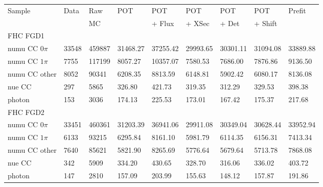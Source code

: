 \begin{table}[ht]
  \begin{adjustbox}{center}
    \tabcolsep=0.11cm
    \begin{tabular}{lllllllll}
      \toprule
      \multirow{2}{*}{Sample} & \multirow{2}{*}{Data} & Raw      & \multirow{2}{*}{\Gls{POT}} & \Gls{POT} & \Gls{POT} & \Gls{POT} & \Gls{POT} & \multirow{2}{*}{Prefit} \\
                              &                       & \Gls{MC} &                            & + Flux    & + XSec    & + Det     & + Shift   &  \\
      \midrule
      \multicolumn{9}{l}{\Gls{FHC} \Gls{FGD}1}              \\
      \midrule
      \Gls{numu} \Gls{CC} $0\pi$    &  33548 &  459887 &  31468.27 &  37255.42 &  29993.65 &  30301.11 & 31094.08 & 33889.88\\
      \Gls{numu} \Gls{CC} $1\pi$    &  7755  &  117199 &  8057.27  &  10357.07 &  7580.53  &  7686.00  & 7876.86  & 9136.50 \\
      \Gls{numu} \Gls{CC} other     &  8052  &  90341  &  6208.35  &  8813.59  &  6148.81  &  5902.42  & 6080.17  & 8136.08 \\
      \Gls{nue}  \Gls{CC}           &  297   &  5865   &  326.80   &  421.73   &  319.35   &  312.29   & 329.53   & 398.38  \\
      photon                        &  153   &  3036   &  174.13   &  225.53   &  173.01   &  167.42   & 175.37   & 217.68  \\
      \midrule
      \multicolumn{9}{l}{\Gls{FHC} \Gls{FGD}2}              \\
      \midrule
      \Gls{numu} \Gls{CC} $0\pi$    &  33451 &  460361 &  31203.39 &  36941.06 &  29911.08 &  30349.04 & 30628.44 & 33952.94\\
      \Gls{numu} \Gls{CC} $1\pi$    &  6133  &  93215  &  6295.84  &  8161.10  &  5981.79  &  6114.35  & 6156.31  & 7413.34 \\
      \Gls{numu} \Gls{CC} other     &  7640  &  85621  &  5821.90  &  8265.69  &  5776.64  &  5679.64  & 5713.78  & 7868.08 \\
      \Gls{nue}  \Gls{CC}           &  342   &  5909   &  334.20   &  430.65   &  328.70   &  316.06   & 336.02   & 403.72  \\
      photon                        &  147   &  2810   &  157.09   &  203.99   &  155.63   &  148.12   & 157.87   & 191.86  \\
      \bottomrule
    \end{tabular}

\end{adjustbox}
\end{table}
